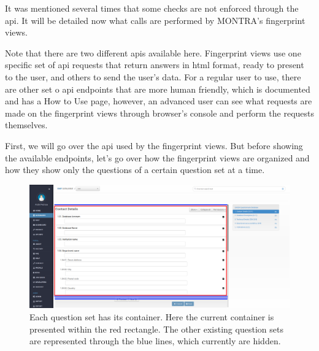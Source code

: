 
It was mentioned several times that some checks are not enforced through the \gls{api}.
It will be detailed now what calls are performed by MONTRA's fingerprint views.

Note that there are two different \gls{api}s available here.
Fingerprint views use one specific set of \gls{api} requests that return answers in \gls{html} format, ready to present to the user, and others to send the user's data.
For a regular user to use, there are other set o \gls{api} endpoints that are more human friendly, which is documented and has a How to Use page, however, an advanced user can see what requests are made on the fingerprint views through browser's console and perform the requests themselves.

First, we will go over the \gls{api} used by the fingerprint views.
But before showing the available endpoints, let's go over how the fingerprint views are organized and how they show only the questions of a certain question set at a time.

\begin{figure}
    \center
    \includegraphics[width=\textwidth]{fingerprint-hidden-question-sets}
    \caption{Each question set has its container.
    Here the current container is presented within the red rectangle.
    The other existing question sets are represented through the blue lines, which currently are hidden.}
    \label{fig:fingerprint-hidden-question-sets}
\end{figure}

